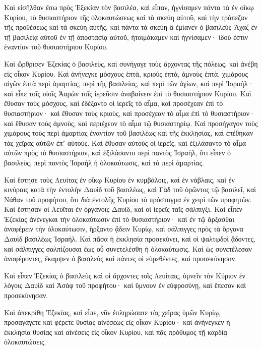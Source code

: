 {\par }{\PP {}Καὶ εἰσῆλθαν ἔσω πρὸς Ἐξεκίαν τὸν βασιλέα, καὶ εἶπαν, ἡγνίσαμεν πάντα τὰ ἐν οἴκῳ Κυρίου, τὸ θυσιαστήριον τῆς ὁλοκαυτώσεως καὶ τὰ σκεύη αὐτοῦ, καὶ τὴν τράπεζαν τῆς προθέσεως καὶ τὰ σκεύη αὐτῆς,
καὶ πάντα τὰ σκεύη ἃ ἐμίανεν ὁ βασιλεὺς Ἄχαζ ἐν τῇ βασιλείᾳ αὐτοῦ ἐν τῇ ἀποστασίᾳ αὐτοῦ, ἡτοιμάκαμεν καὶ ἡγνίσαμεν· ἰδού ἐστιν ἐναντίον τοῦ θυσιαστήριου Κυρίου.
\par }{\PP {}Καὶ ὤρθρισεν Ἐζεκίας ὁ βασιλεὺς, καὶ συνήγαγε τοὺς ἄρχοντας τῆς πόλεως, καὶ ἀνέβη εἰς οἶκον Κυρίου.
Καὶ ἀνήνεγκε μόσχους ἑπτὰ, κριοὺς ἑπτὰ, ἀμνοὺς ἑπτὰ, χιμάρους αἰγῶν ἑπτὰ περὶ ἁμαρτίας, περὶ τῆς βασιλείας, καὶ περὶ τῶν ἁγίων, καὶ περὶ Ἰσραήλ· καὶ εἶπε τοῖς υἱοῖς Ἀαρὼν τοῖς ἱερεῦσιν ἀναβαίνειν ἐπὶ τὸ θυσιαστήριον Κυρίου.
Καὶ ἔθυσαν τοὺς μόσχους, καὶ ἐδέξαντο οἱ ἱερεῖς τὸ αἷμα, καὶ προσέχεαν ἐπὶ τὸ θυσιαστήριον· καὶ ἔθυσαν τοὺς κριοὺς, καὶ προσέχεαν τὸ αἷμα ἐπὶ τὸ θυσιαστήριον· καὶ ἔθυσαν τοὺς ἀμνοὺς, καὶ περιέχεον τὸ αἷμα τῷ θυσιαστηρίῳ.
Καὶ προσήγαγον τοὺς χιμάρους τοὺς περὶ ἁμαρτίας ἐναντίον τοῦ βασιλέως καὶ τῆς ἐκκλησίας, καὶ ἐπέθηκαν τὰς χεῖρας αὐτῶν ἐπʼ αὐτούς.
Καὶ ἔθυσαν αὐτοὺς οἱ ἱερεῖς, καὶ ἐξιλάσαντο τὸ αἷμα αὐτῶν πρὸς τὸ θυσιαστήριον, καὶ ἐξιλάσαντο περὶ παντὸς Ἰσραὴλ, ὅτι εἶπεν ὁ βασιλεὺς, περὶ παντὸς Ἰσραὴλ ἡ ὁλοκαύτωσις, καὶ τὰ περὶ ἁμαρτίας.
\par }{\PP {}Καὶ ἔστησε τοὺς Λευίτας ἐν οἴκῳ Κυρίου ἐν κυμβάλοις, καὶ ἐν νάβλαις, καὶ ἐν κινύραις κατὰ τὴν ἐντολὴν Δαυὶδ τοῦ βασιλέως, καὶ Γὰδ τοῦ ὁρῶντος τῷ βασιλεῖ, καὶ Νάθαν τοῦ προφήτου, ὅτι διὰ ἐντολῆς Κυρίου τὸ πρόσταγμα ἐν χειρὶ τῶν προφητῶν.
Καὶ ἔστησαν οἱ Λευῖται ἐν ὀργάνοις Δαυὶδ, καὶ οἱ ἱερεῖς ταῖς σάλπιγξι.
Καὶ εἶπεν Ἐζεκίας ἀνένεγκαι τὴν ὁλοκαύτωσιν ἐπὶ τὸ θυσιαστήριον· καὶ ἐν τῷ ἄρξασθαι ἀναφέρειν τὴν ὁλοκαύτωσιν, ἤρξαντο ᾄδειν Κυρίῳ, καὶ σάλπιγγες πρὸς τὰ ὄργανα Δαυὶδ βασιλέως Ἰσραήλ.
Καὶ πᾶσα ἡ ἐκκλησία προσεκύνει, καὶ οἱ ψαλτῳδοὶ ᾄδοντες, καὶ σάλπιγγες σαλπίζουσαι ἕως οὗ συνετελέσθη ἡ ὁλοκαύτωσις.
Καὶ ὡς συνετέλεσαν ἀναφέροντες, ἔκαμψεν ὁ βασιλεὺς καὶ πάντες οἱ εὑρεθέντες, καὶ προσεκύνησαν.
\par }{\PP {}Καὶ εἶπεν Ἐζεκίας ὁ βασιλεὺς καὶ οἱ ἄρχοντες τοῖς Λευίταις, ὑμνεῖν τὸν Κύριον ἐν λόγοις Δαυὶδ καὶ Ἀσὰφ τοῦ προφήτου· καὶ ὕμνουν ἐν εὐφροσύνῃ, καὶ ἔπεσον καὶ προσεκύνησαν.
\par }{\PP {}Καὶ ἀπεκρίθη Ἐζεκίας, καὶ εἶπε, νῦν ἐπληρώσατε τὰς χεῖρας ὑμῶν Κυρίῳ, προσαγάγετε καὶ φέρετε θυσίας αἰνέσεως εἰς οἶκον Κυρίου· καὶ ἀνήνεγκεν ἡ ἐκκλησία θυσίας καὶ αἰνέσεις εἰς οἶκον Κυρίου, καὶ πᾶς πρόθυμος τῇ καρδίᾳ ὁλοκαυτώσεις.
}
